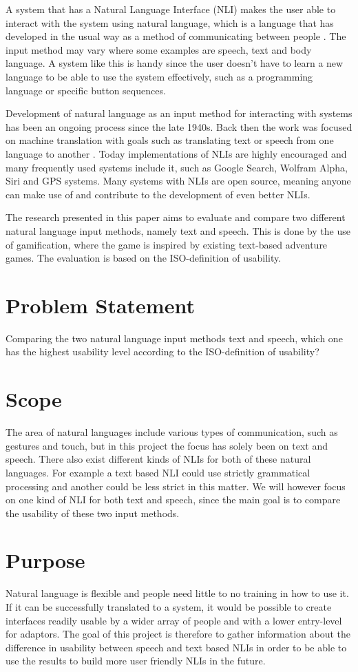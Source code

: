 A system that has a Natural Language Interface (NLI) makes the user able to interact with the system using natural language, which is a language that has developed in the usual way as a method of communicating between people \citep{NatLan}. The input method may vary where some examples are speech, text and body language. A system like this is handy since the user doesn't have to learn a new language to be able to use the system effectively, such as a programming language or specific button sequences.

Development of natural language as an input method for interacting with systems has been an ongoing process since the late 1940s. Back then the work was focused on machine translation with goals such as translating text or speech from one language to another \citep{Jones}. Today implementations of NLIs are highly encouraged and many frequently used systems include it, such as Google Search, Wolfram Alpha, Siri and GPS systems. Many systems with NLIs are open source, meaning anyone can make use of and contribute to the development of even better NLIs.

The research presented in this paper aims to evaluate and compare two different natural language input methods, namely text and speech. This is done by the use of gamification, where the game is inspired by existing text-based adventure games. The evaluation is based on the ISO-definition of usability.

\section{Problem Statement}
Comparing the two natural language input methods text and speech, which one has the highest usability level according to the ISO-definition of usability?

\section{Scope}
The area of natural languages include various types of communication, such as gestures and touch, but in this project the focus has solely been on text and speech. There also exist different kinds of NLIs for both of these natural languages. For example a text based NLI could use strictly grammatical processing and another could be less strict in this matter. We will however focus on one kind of NLI for both text and speech, since the main goal is to compare the usability of these two input methods.

\section{Purpose}
Natural language is flexible and people need little to no training in how to use it. If it can be successfully translated to a system, it would be possible to create interfaces readily usable by a wider array of people and with a lower entry-level for adaptors. The goal of this project is therefore to gather information about the difference in usability between speech and text based NLIs in order to be able to use the results to build more user friendly NLIs in the future.

